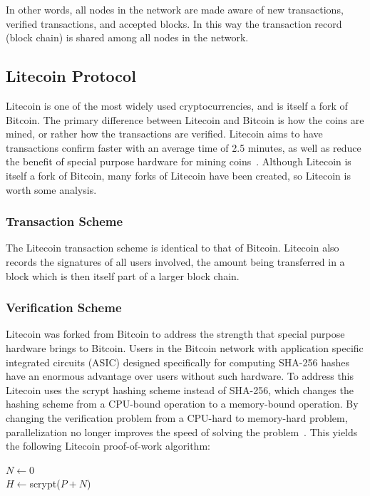 \documentclass[11pt]{article}
\begin{document}
In other words, all nodes in the network are made aware of new transactions,
verified transactions, and accepted blocks. In this way the transaction record
(block chain) is shared among all nodes in the network.

\subsection{Litecoin Protocol}
Litecoin is one of the most widely used cryptocurrencies, and is itself a fork
of Bitcoin. The primary difference between Litecoin and Bitcoin is how the coins
are mined, or rather how the transactions are verified. Litecoin aims to have
transactions confirm faster with an average time of 2.5 minutes, as well as
reduce the benefit of special purpose hardware for mining coins~\cite{ahamad13}.
Although Litecoin is itself a fork of Bitcoin, many forks of Litecoin have been
created, so Litecoin is worth some analysis.

\subsubsection{Transaction Scheme}
The Litecoin transaction scheme is identical to that of
Bitcoin. Litecoin also records the signatures of all users involved, the amount
being transferred in a block which is then itself part of a larger block
chain.

\subsubsection{Verification Scheme}
Litecoin was forked from Bitcoin to address the strength that special purpose
hardware brings to Bitcoin. Users in the Bitcoin network with application
specific integrated circuits (ASIC) designed specifically for computing SHA-256
hashes have an enormous advantage over users without such hardware. To address
this Litecoin uses the scrypt hashing scheme instead of SHA-256, which changes
the hashing scheme from a CPU-bound operation to a memory-bound operation. By
changing the verification problem from a CPU-hard to memory-hard problem,
parallelization no longer improves the speed of solving the
problem~\cite{percival09}. This yields the following Litecoin proof-of-work
algorithm:
\begin{algorithm}
    $N \gets 0$\\
    $H \gets ${\sc scrypt($P + N$)}\\
\end{algorithm}
\end{document}
